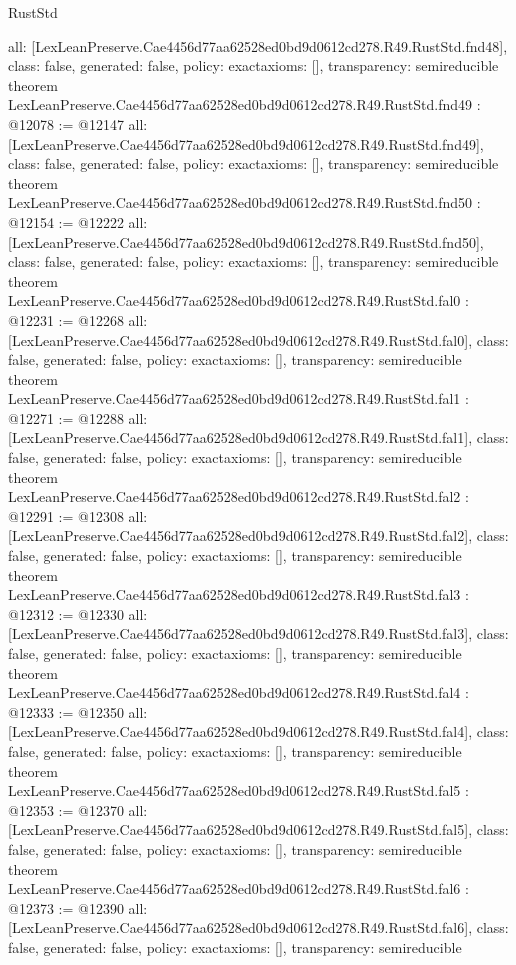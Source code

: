 \begin{lexlean}{RustStd}
\begin{coremodule}
{  all: [LexLeanPreserve.Cae4456d77aa62528ed0bd9d0612cd278.R49.RustStd.fnd48],
  class: false,
  generated: false,
  policy: exact{axioms: []},
  transparency: semireducible
}
theorem LexLeanPreserve.Cae4456d77aa62528ed0bd9d0612cd278.R49.RustStd.fnd49 : @12078 := @12147 {
  all: [LexLeanPreserve.Cae4456d77aa62528ed0bd9d0612cd278.R49.RustStd.fnd49],
  class: false,
  generated: false,
  policy: exact{axioms: []},
  transparency: semireducible
}
theorem LexLeanPreserve.Cae4456d77aa62528ed0bd9d0612cd278.R49.RustStd.fnd50 : @12154 := @12222 {
  all: [LexLeanPreserve.Cae4456d77aa62528ed0bd9d0612cd278.R49.RustStd.fnd50],
  class: false,
  generated: false,
  policy: exact{axioms: []},
  transparency: semireducible
}
theorem LexLeanPreserve.Cae4456d77aa62528ed0bd9d0612cd278.R49.RustStd.fal0 : @12231 := @12268 {
  all: [LexLeanPreserve.Cae4456d77aa62528ed0bd9d0612cd278.R49.RustStd.fal0],
  class: false,
  generated: false,
  policy: exact{axioms: []},
  transparency: semireducible
}
theorem LexLeanPreserve.Cae4456d77aa62528ed0bd9d0612cd278.R49.RustStd.fal1 : @12271 := @12288 {
  all: [LexLeanPreserve.Cae4456d77aa62528ed0bd9d0612cd278.R49.RustStd.fal1],
  class: false,
  generated: false,
  policy: exact{axioms: []},
  transparency: semireducible
}
theorem LexLeanPreserve.Cae4456d77aa62528ed0bd9d0612cd278.R49.RustStd.fal2 : @12291 := @12308 {
  all: [LexLeanPreserve.Cae4456d77aa62528ed0bd9d0612cd278.R49.RustStd.fal2],
  class: false,
  generated: false,
  policy: exact{axioms: []},
  transparency: semireducible
}
theorem LexLeanPreserve.Cae4456d77aa62528ed0bd9d0612cd278.R49.RustStd.fal3 : @12312 := @12330 {
  all: [LexLeanPreserve.Cae4456d77aa62528ed0bd9d0612cd278.R49.RustStd.fal3],
  class: false,
  generated: false,
  policy: exact{axioms: []},
  transparency: semireducible
}
theorem LexLeanPreserve.Cae4456d77aa62528ed0bd9d0612cd278.R49.RustStd.fal4 : @12333 := @12350 {
  all: [LexLeanPreserve.Cae4456d77aa62528ed0bd9d0612cd278.R49.RustStd.fal4],
  class: false,
  generated: false,
  policy: exact{axioms: []},
  transparency: semireducible
}
theorem LexLeanPreserve.Cae4456d77aa62528ed0bd9d0612cd278.R49.RustStd.fal5 : @12353 := @12370 {
  all: [LexLeanPreserve.Cae4456d77aa62528ed0bd9d0612cd278.R49.RustStd.fal5],
  class: false,
  generated: false,
  policy: exact{axioms: []},
  transparency: semireducible
}
theorem LexLeanPreserve.Cae4456d77aa62528ed0bd9d0612cd278.R49.RustStd.fal6 : @12373 := @12390 {
  all: [LexLeanPreserve.Cae4456d77aa62528ed0bd9d0612cd278.R49.RustStd.fal6],
  class: false,
  generated: false,
  policy: exact{axioms: []},
  transparency: semireducible
}
\end{coremodule}
\end{lexlean}
